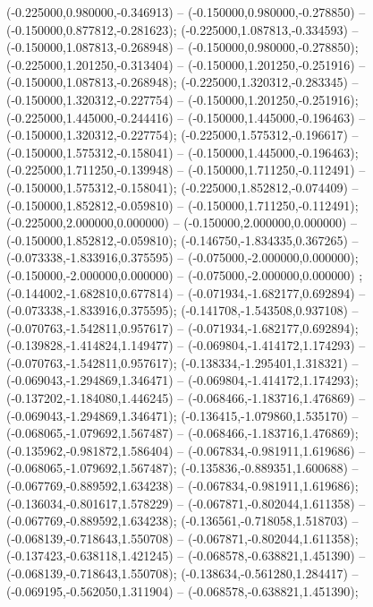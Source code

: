  (-0.225000,0.980000,-0.346913) -- (-0.150000,0.980000,-0.278850) -- (-0.150000,0.877812,-0.281623);
 (-0.225000,1.087813,-0.334593) -- (-0.150000,1.087813,-0.268948) -- (-0.150000,0.980000,-0.278850);
 (-0.225000,1.201250,-0.313404) -- (-0.150000,1.201250,-0.251916) -- (-0.150000,1.087813,-0.268948);
 (-0.225000,1.320312,-0.283345) -- (-0.150000,1.320312,-0.227754) -- (-0.150000,1.201250,-0.251916);
 (-0.225000,1.445000,-0.244416) -- (-0.150000,1.445000,-0.196463) -- (-0.150000,1.320312,-0.227754);
 (-0.225000,1.575312,-0.196617) -- (-0.150000,1.575312,-0.158041) -- (-0.150000,1.445000,-0.196463);
 (-0.225000,1.711250,-0.139948) -- (-0.150000,1.711250,-0.112491) -- (-0.150000,1.575312,-0.158041);
 (-0.225000,1.852812,-0.074409) -- (-0.150000,1.852812,-0.059810) -- (-0.150000,1.711250,-0.112491);
 (-0.225000,2.000000,0.000000) -- (-0.150000,2.000000,0.000000) -- (-0.150000,1.852812,-0.059810);
 (-0.146750,-1.834335,0.367265) -- (-0.073338,-1.833916,0.375595) -- (-0.075000,-2.000000,0.000000);
 (-0.150000,-2.000000,0.000000) -- (-0.075000,-2.000000,0.000000) ;
 (-0.144002,-1.682810,0.677814) -- (-0.071934,-1.682177,0.692894) -- (-0.073338,-1.833916,0.375595);
 (-0.141708,-1.543508,0.937108) -- (-0.070763,-1.542811,0.957617) -- (-0.071934,-1.682177,0.692894);
 (-0.139828,-1.414824,1.149477) -- (-0.069804,-1.414172,1.174293) -- (-0.070763,-1.542811,0.957617);
 (-0.138334,-1.295401,1.318321) -- (-0.069043,-1.294869,1.346471) -- (-0.069804,-1.414172,1.174293);
 (-0.137202,-1.184080,1.446245) -- (-0.068466,-1.183716,1.476869) -- (-0.069043,-1.294869,1.346471);
 (-0.136415,-1.079860,1.535170) -- (-0.068065,-1.079692,1.567487) -- (-0.068466,-1.183716,1.476869);
 (-0.135962,-0.981872,1.586404) -- (-0.067834,-0.981911,1.619686) -- (-0.068065,-1.079692,1.567487);
 (-0.135836,-0.889351,1.600688) -- (-0.067769,-0.889592,1.634238) -- (-0.067834,-0.981911,1.619686);
 (-0.136034,-0.801617,1.578229) -- (-0.067871,-0.802044,1.611358) -- (-0.067769,-0.889592,1.634238);
 (-0.136561,-0.718058,1.518703) -- (-0.068139,-0.718643,1.550708) -- (-0.067871,-0.802044,1.611358);
 (-0.137423,-0.638118,1.421245) -- (-0.068578,-0.638821,1.451390) -- (-0.068139,-0.718643,1.550708);
 (-0.138634,-0.561280,1.284417) -- (-0.069195,-0.562050,1.311904) -- (-0.068578,-0.638821,1.451390);
